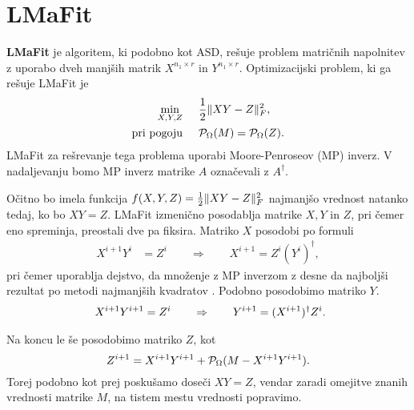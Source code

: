 \section{LMaFit} \label{2807-1447}
\textbf{LMaFit} \cite{LMaFit-WY12} je algoritem, ki podobno kot ASD, rešuje problem matričnih napolnitev z uporabo dveh manjših matrik $X^{n_1 \times r}$ in $Y^{n_1 \times r}$.
Optimizacijski problem, ki ga rešuje LMaFit je
\begin{align*}
    \min_{X, Y, Z}& \hspace{0.5cm} \frac{1}{2}\lVert XY - Z\rVert_F^2,\\
    \text{pri pogoju}& \hspace{0.5cm} \mathcal{P}_\Omega(M) = \mathcal{P}_\Omega(Z).
\end{align*}
LMaFit za rešrevanje tega problema uporabi
Moore-Penroseov (MP) inverz. V nadaljevanju bomo MP inverz matrike $A$ označevali z $A^\dagger$.

Očitno bo imela funkcija $f(X,Y,Z) = \frac{1}{2}\lVert XY - Z\rVert_F^2$ najmanjšo vrednost natanko tedaj, ko bo $XY = Z$. 
LMaFit izmenično posodablja matrike $X, Y$ in $Z$, pri čemer eno spreminja, preostali dve pa fiksira. Matriko $X$ posodobi po formuli
\begin{align*}
    X^{i+1}Y^{i}&= Z^{i}
    \qquad 
    \Rightarrow
    \qquad
    X^{i+1} = Z^{i}(Y^i)^\dagger,
\end{align*}
pri čemer uporablja dejstvo, da množenje z MP inverzom z desne 
da najboljši rezultat po metodi najmanjših kvadratov \cite[pogl. 3]{demmel97}.
Podobno posodobimo matriko $Y$.
\begin{align*}
    \hspace{0.5cm} X^{i+1}Y^{i+1} &= Z^{i}    \qquad 
    \Rightarrow
    \qquad
    Y^{i+1} = (X^{i+1})^\dagger Z^{i}.
\end{align*}

Na koncu le še posodobimo matriko $Z$, kot
\[
    Z^{i+1} = X^{i+1}Y^{i+1} + \mathcal{P}_\Omega(M - X^{i+1}Y^{i+1}).
\]
Torej podobno kot prej poskušamo doseči $XY = Z$, vendar zaradi omejitve znanih vrednosti matrike $M$, na tistem mestu vrednosti popravimo.
